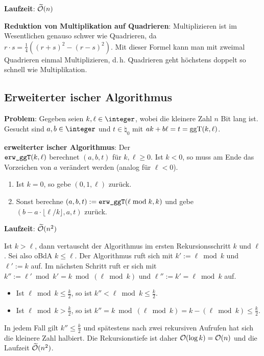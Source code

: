 \textbf{Laufzeit}:
$\widetilde{\mathcal{O}}(n)$

\linie

\textbf{Reduktion von Multiplikation auf Quadrieren}:
Multiplizieren ist im Wesentlichen genauso schwer wie Quadrieren,
da $r \cdot s = \frac{1}{4} ((r + s)^2 - (r - s)^2)$.
Mit dieser Formel kann man mit zweimal Quadrieren einmal Multiplizieren,
d.\,h. Quadrieren geht höchstens doppelt so schnell wie Multiplikation.

\subsection{%
    Erweiterter ischer Algorithmus%
}

\textbf{Problem}:
Gegeben seien $k, \ell \in \integer$, wobei die kleinere Zahl $n$ Bit lang ist.\\
Gesucht sind $a, b \in \integer$ und $t \in \natural_0$ mit
$ak + b\ell = t = \operatorname{ggT}(k, \ell)$.

\textbf{erweiterter ischer Algorithmus}:
Der \\
$\texttt{erw\_ggT}(k, \ell)$
berechnet $(a, b, t)$ für $k, \ell \ge 0$.
Ist $k < 0$, so muss am Ende das Vorzeichen von $a$ verändert werden
(analog für $\ell < 0$).
\begin{enumerate}
    \item
    Ist $k = 0$, so gebe $(0, 1, \ell)$ zurück.
    
    \item
    Sonst berechne $(a, b, t) := \texttt{erw\_ggT}(\ell \bmod k, k)$
    und gebe $(b - a \cdot \lfloor \ell/k \rfloor, a, t)$ zurück.
\end{enumerate}

\textbf{Laufzeit}:
$\widetilde{\mathcal{O}}(n^2)$

\begin{Beweis}
    Ist $k > \ell$, dann vertauscht der Algorithmus im ersten Rekursionsschritt $k$ und $\ell$.
    Sei also oBdA $k \le \ell$.
    Der Algorithmus ruft sich mit $k' := \ell \bmod k$ und $\ell' := k$ auf.
    Im nächsten Schritt ruft er sich mit $k'' := \ell' \bmod k' = k \bmod (\ell \bmod k)$ und
    $\ell'' := k' = \ell \bmod k$ auf.
    \begin{itemize}
        \item
        Ist $\ell \bmod k \le \frac{k}{2}$, so ist $k'' < \ell \bmod k \le \frac{k}{2}$.
        
        \item
        Ist $\ell \bmod k > \frac{k}{2}$, so ist
        $k'' = k \bmod (\ell \bmod k) = k - (\ell \bmod k) \le \frac{k}{2}$. 
    \end{itemize}
    In jedem Fall gilt $k'' \le \frac{k}{2}$ und spätestens nach zwei rekursiven Aufrufen hat
    sich die kleinere Zahl halbiert.
    Die Rekursionstiefe ist daher $\mathcal{O}(\log k) = \mathcal{O}(n)$ und die Laufzeit $\widetilde{\mathcal{O}}(n^2)$.
\end{Beweis}

